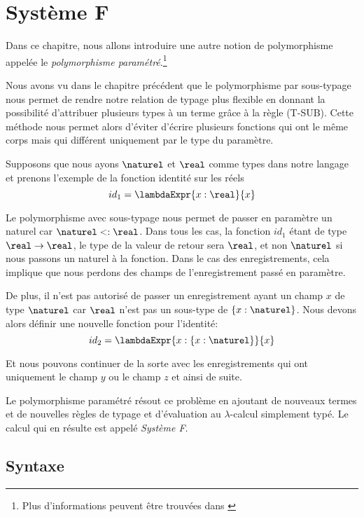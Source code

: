 \chapter{Système F}
\label{chapter:system-f}

Dans ce chapitre, nous allons introduire une autre notion de polymorphisme
appelée le \textit{polymorphisme paramétré}.\footnote{Plus d'informations peuvent
être trouvées dans \cite{tapl-system-f}}

Nous avons vu dans le chapitre précédent que le polymorphisme par sous-typage
nous permet de rendre notre relation de typage plus flexible en donnant la
possibilité d'attribuer plusieurs types à un terme grâce à la règle (T-SUB). Cette
méthode nous permet alors d'éviter
d'écrire plusieurs fonctions qui ont le même corps mais qui différent uniquement
par le type du paramètre.

Supposons que nous ayons $\naturel$ et $\real$ comme types dans notre langage et
prenons l'exemple de la fonction identité sur les réels
\begin{equation*}
  id_{1} = \lambdaExpr{x : \real}{x}
\end{equation*}

Le polymorphisme avec sous-typage nous permet de passer en paramètre un
naturel
car $\naturel <: \real$. Dans tous les cas, la fonction $id_{1}$ étant de type
$\real \rightarrow \real$, le type de la valeur de retour sera $\real$, et non
$\naturel$ si nous passons un naturel à la fonction.
Dans le cas des enregistrements, cela implique que nous perdons des
champs de l'enregistrement passé en paramètre.

De plus, il n'est pas autorisé de passer un
enregistrement ayant un champ $x$ de type $\naturel$ car $\real$ n'est pas
un sous-type de $\left\{ x : \naturel \right\}$. Nous devons alors définir une
nouvelle fonction pour l'identité:
\begin{equation*}
  id_{2} = \lambdaExpr{x : \left\{ x : \naturel \right\}}{x}
\end{equation*}

Et nous pouvons continuer de la sorte avec les enregistrements qui ont
uniquement le champ $y$ ou le champ $z$ et ainsi de suite.

Le polymorphisme paramétré résout ce problème en ajoutant de nouveaux termes
et de nouvelles règles de typage et d'évaluation au $\lambda$-calcul simplement
typé. Le calcul qui en résulte est appelé \textit{Système F}.

\section{Syntaxe}

